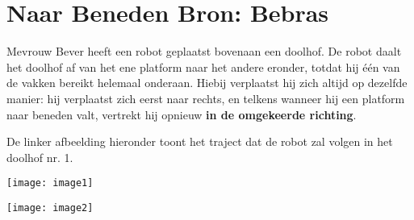 \documentclass[12pt]{article}
\begin{document}
	\begin{minipage}{\textwidth}
		\section{Naar Beneden \hfill\small Bron: Bebras}
			Mevrouw Bever heeft een robot geplaatst bovenaan een doolhof. De robot daalt het doolhof af van het ene platform naar het andere eronder, totdat hij één van de vakken bereikt helemaal onderaan. Hiebij verplaatst hij zich altijd op dezelfde manier: hij verplaatst zich eerst naar rechts, en telkens wanneer hij een platform naar beneden valt, vertrekt hij opnieuw \textbf{in de omgekeerde richting}.
			
			De linker afbeelding hieronder toont het traject dat de robot zal volgen in het doolhof nr. 1. \\
	
			\begin{minipage}{0.49\linewidth}
				\texttt{[image: image1]}
			\end{minipage} \hfill
			\begin{minipage}{0.49\linewidth}
				\texttt{[image: image2]}
			\end{minipage}

	\end{minipage} \\ \\
	
\end{document}
